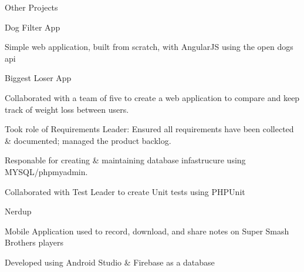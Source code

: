 \documentclass{resume} %
\begin{document}
\begin{rSection}{Other Projects}

    \begin{rSubsection}{Dog Filter App}{}{}{}
        \item Simple web application, built from scratch, with AngularJS using the open dogs api
    \end{rSubsection}

    \begin{rSubsection}{Biggest Loser App}{}{}{}
        \item Collaborated with a team of five to create a web application to compare and keep track of weight loss between users.
        \item Took role of Requirements Leader:  Ensured all requirements have been collected \& documented; managed the product backlog.
        \item Responable for creating \& maintaining database infastrucure using MYSQL/phpmyadmin.
        \item Collaborated with Test Leader to create Unit tests using PHPUnit
    \end{rSubsection}

    \begin{rSubsection}{Nerdup}{}{}{}
        \item Mobile Application used to record, download, and share notes on Super Smash Brothers players
        \item Developed using Android Studio \& Firebase as a database
    \end{rSubsection}

\end{rSection}

\end{document}
